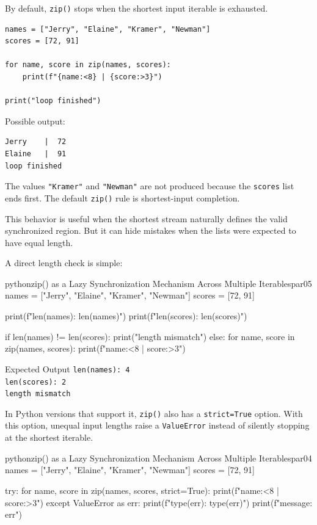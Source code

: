 By default, \texttt{zip()} stops when the shortest input iterable is exhausted.

\begin{verbatim}
names = ["Jerry", "Elaine", "Kramer", "Newman"]
scores = [72, 91]

for name, score in zip(names, scores):
    print(f"{name:<8} | {score:>3}")

print("loop finished")
\end{verbatim}

Possible output:

\begin{verbatim}
Jerry    |  72
Elaine   |  91
loop finished
\end{verbatim}

The values \texttt{"Kramer"} and \texttt{"Newman"} are not produced because the \texttt{scores} list ends first. The default \texttt{zip()} rule is shortest-input completion.

This behavior is useful when the shortest stream naturally defines the valid synchronized region. But it can hide mistakes when the lists were expected to have equal length.

A direct length check is simple:

\begin{codebox}[]{python}{zip() as a Lazy Synchronization Mechanism Across Multiple Iterables}{par05}
names = ["Jerry", "Elaine", "Kramer", "Newman"]
scores = [72, 91]

print(f"len(names): {len(names)}")
print(f"len(scores): {len(scores)}")

if len(names) != len(scores):
    print("length mismatch")
else:
    for name, score in zip(names, scores):
        print(f"{name:<8} | {score:>3}")
\end{codebox}


\begin{iobox}{Expected Output}
\texttt{len(names): 4} \\
\texttt{len(scores): 2} \\
\texttt{length mismatch} \\
\end{iobox}


In Python versions that support it, \texttt{zip()} also has a \texttt{strict=True} option. With this option, unequal input lengths raise a \texttt{ValueError} instead of silently stopping at the shortest iterable.

\begin{codebox}[]{python}{zip() as a Lazy Synchronization Mechanism Across Multiple Iterables}{par04}
names = ["Jerry", "Elaine", "Kramer", "Newman"]
scores = [72, 91]

try:
    for name, score in zip(names, scores, strict=True):
        print(f"{name:<8} | {score:>3}")
except ValueError as err:
    print(f"type(err): {type(err)}")
    print(f"message: {err}")
\end{codebox}


